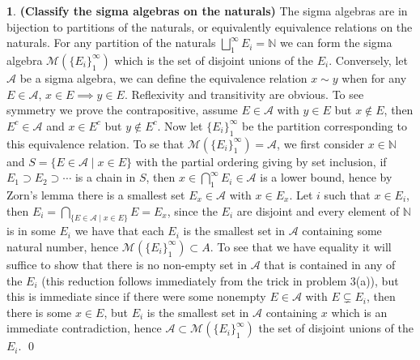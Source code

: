 \documentclass[10.5pt]{article}
\theoremstyle{definition}
\newtheorem{pb}{}
\newcommand{\set}[1]{\{#1\}}
\begin{document}
    \begin{pb}\textbf{(Classify the sigma algebras on the naturals)} The sigma algebras are in bijection to partitions of the naturals, or equivalently equivalence relations on the naturals. For any partition of the naturals \(\bigsqcup_1^\infty E_i = \mathbb{N}\) we can form the sigma algebra \(\mathcal{M}(\set{E_i}_1^\infty)\) which is the set of disjoint unions of the \(E_i\). Conversely, let \(\mathcal{A}\) be a sigma algebra, we can define the equivalence relation \(x \sim y\) when for any \(E \in \mathcal{A}\), \(x \in E \implies y \in E\). Reflexivity and transitivity are obvious. To see symmetry we prove the contrapositive, assume \(E \in \mathcal{A}\) with \(y \in E\) but \(x \not \in E\), then \(E^c \in \mathcal{A}\) and \(x \in E^c\) but \(y \not \in E^c\). Now let \(\set{E_i}_1^\infty\) be the partition corresponding to this equivalence relation. To se that \(\mathcal{M}(\set{E_i}_1^\infty) = \mathcal{A}\), we first consider \(x \in \mathbb{N}\) and \(S = \set{E \in \mathcal{A} \mid x \in E}\) with the partial ordering giving by set inclusion, if \(E_1 \supset E_2 \supset \cdots\) is a chain in \(S\), then \(x \in \bigcap_1^\infty E_i \in \mathcal{A}\) is a lower bound, hence by Zorn's lemma there is a smallest set \(E_x \in \mathcal{A}\) with \(x \in E_x\). Let \(i\) such that \(x \in E_i\), then \(E_i = \bigcap_{\set{E \in \mathcal{A}\mid x \in E}}E = E_x\), since the \(E_i\) are disjoint and every element of \(\mathbb{N}\) is in some \(E_i\) we have that each \(E_i\) is the smallest set in \(\mathcal{A}\) containing some natural number, hence \(\mathcal{M}(\set{E_i}_1^\infty) \subset A\). To see that we have equality it will suffice to show that there is no non-empty set in \(\mathcal{A}\) that is contained in any of the \(E_i\) (this reduction follows immediately from the trick in problem 3(a)), but this is immediate since if there were some nonempty \(E \in \mathcal{A}\) with \(E \subsetneq E_i\), then there is some \(x \in E\), but \(E_i\) is the smallest set in \(\mathcal{A}\) containing \(x\) which is an immediate contradiction, hence \(\mathcal{A} \subset \mathcal{M}(\set{E_i}_1^\infty)\) the set of disjoint unions of the \(E_i\). \qed
    \end{pb}
\end{document}
